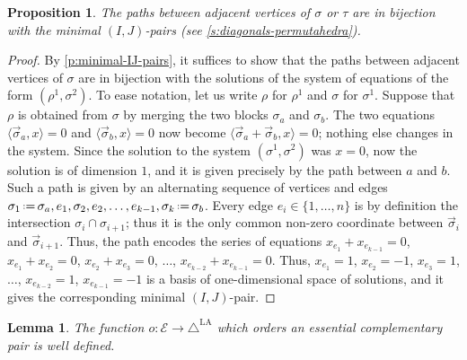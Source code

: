 \documentclass{amsart}
\newtheorem{proposition}[theorem]{Proposition}
\newtheorem{lemma}[theorem]{Lemma}
\theoremstyle{definition}
\newcommand{\eqdef}{\mbox{\,\raisebox{0.2ex}{\scriptsize\ensuremath{\mathrm:}}\ensuremath{=}\,}} %
\newcommand{\LAD}{\triangle^{\mathrm{LA}}}
\newcommand{\EC}{\mathcal{E}} %
\begin{document}
\begin{proposition}
    \label{prop:geometrical-IJ}
    The paths between adjacent vertices of $\sigma$ or $\tau$ are in bijection with the minimal $(I,J)$-pairs (see \cref{s:diagonals-permutahedra}).
\end{proposition}

\begin{proof}
    By \cref{p:minimal-IJ-pairs}, it suffices to show that the paths between adjacent vertices of $\sigma$ are in bijection with the solutions of the system of equations of the form $(\rho^1,\sigma^2)$. 
    To ease notation, let us write $\rho$ for $\rho^1$ and $\sigma$ for $\sigma^1$. 
    Suppose that $\rho$ is obtained from $\sigma$ by merging the two blocks $\sigma_a$ and $\sigma_b$. 
    The two equations $\langle \vec \sigma_a, x \rangle =0$ and $\langle \vec \sigma_b, x \rangle =0$ now become $\langle \vec \sigma_a + \vec \sigma_b, x \rangle =0$; nothing else changes in the system. 
    Since the solution to the system $(\sigma^1,\sigma^2)$ was $x=0$, now the solution is of dimension $1$, and it is given precisely by the path between $a$ and $b$.
    Such a path is given by an alternating sequence of vertices and edges $\sigma_1 \eqdef \sigma_a, e_1, \sigma_2, e_2, \ldots, e_{k-1}, \sigma_k \eqdef \sigma_b$. 
    Every edge $e_i \in \{1,\ldots, n\}$ is by definition the intersection $\sigma_{i} \cap \sigma_{i+1}$; thus it is the only common non-zero coordinate between $\vec \sigma_{i}$ and $\vec \sigma_{i+1}$.
    Thus, the path encodes the series of equations $x_{e_1}+x_{e_{k-1}}=0$, $x_{e_1}+x_{e_2}=0$, $x_{e_2}+x_{e_3}=0$, $\ldots$, $x_{e_{k-2}}+x_{e_{k-1}}=0$. 
    Thus, $x_{e_1}=1$, $x_{e_2}=-1$, $x_{e_3}=1$, $\ldots$, $x_{e_{k-2}}=1$, $x_{e_{k-1}}=-1$ is a basis of one-dimensional space of solutions, and it gives the corresponding minimal $(I,J)$-pair. 
\end{proof}

\begin{lemma} 
\label{l:o-well-defined}
The function $o:\EC \to \LAD$ which orders an essential complementary pair is well defined.
\end{lemma}
\end{document}
